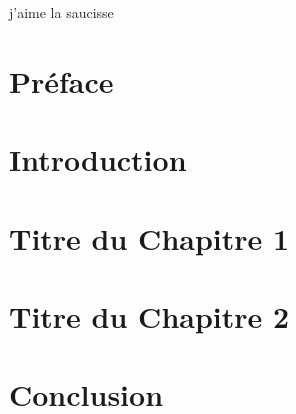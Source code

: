 \documentclass[12pt,a4paper]{report}
\begin{document}



j'aime la saucisse

\chapter*{Préface}

\tableofcontents
\newpage

\chapter{Introduction}
 

\chapter{Titre du Chapitre 1}
% 


\chapter{Titre du Chapitre 2}
% 

\chapter{Conclusion}


% 
% 



\end{document}
